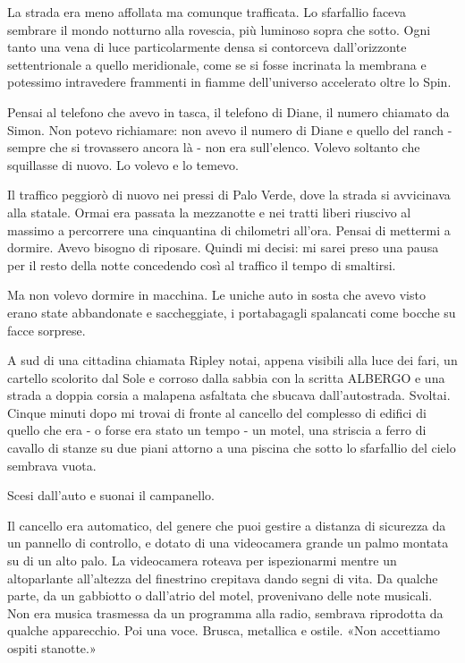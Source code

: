 La strada era meno affollata ma comunque trafficata. Lo sfarfallio
faceva sembrare il mondo notturno alla rovescia, più luminoso sopra che
sotto. Ogni tanto una vena di luce particolarmente densa si contorceva
dall'orizzonte settentrionale a quello meridionale, come se si fosse
incrinata la membrana e potessimo intravedere frammenti in fiamme
dell'universo accelerato oltre lo Spin.

Pensai al telefono che avevo in tasca, il telefono di Diane, il numero
chiamato da Simon. Non potevo richiamare: non avevo il numero di Diane e
quello del ranch - sempre che si trovassero ancora là - non era
sull'elenco. Volevo soltanto che squillasse di nuovo. Lo volevo e lo
temevo.

Il traffico peggiorò di nuovo nei pressi di Palo Verde, dove la strada
si avvicinava alla statale. Ormai era passata la mezzanotte e nei tratti
liberi riuscivo al massimo a percorrere una cinquantina di chilometri
all'ora. Pensai di mettermi a dormire. Avevo bisogno di riposare. Quindi
mi decisi: mi sarei preso una pausa per il resto della notte concedendo
così al traffico il tempo di smaltirsi.

Ma non volevo dormire in macchina. Le uniche auto in sosta che avevo
visto erano state abbandonate e saccheggiate, i portabagagli spalancati
come bocche su facce sorprese.

A sud di una cittadina chiamata Ripley notai, appena visibili alla luce
dei fari, un cartello scolorito dal Sole e corroso dalla sabbia con la
scritta {ALBERGO} e una strada a doppia corsia a malapena asfaltata che
sbucava dall'autostrada. Svoltai. Cinque minuti dopo mi trovai di fronte
al cancello del complesso di edifici di quello che era - o forse era
stato un tempo - un motel, una striscia a ferro di cavallo di stanze su
due piani attorno a una piscina che sotto lo sfarfallio del cielo
sembrava vuota.

Scesi dall'auto e suonai il campanello.

Il cancello era automatico, del genere che puoi gestire a distanza di
sicurezza da un pannello di controllo, e dotato di una videocamera
grande un palmo montata su di un alto palo. La videocamera roteava per
ispezionarmi mentre un altoparlante all'altezza del finestrino crepitava
dando segni di vita. Da qualche parte, da un gabbiotto o dall'atrio del
motel, provenivano delle note musicali. Non era musica trasmessa da un
programma alla radio, sembrava riprodotta da qualche apparecchio. Poi
una voce. Brusca, metallica e ostile. «Non accettiamo ospiti stanotte.»

